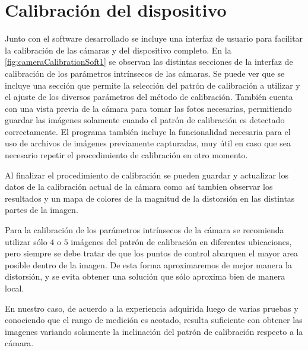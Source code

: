 \section{Calibración del dispositivo}
Junto con el software desarrollado se incluye una interfaz de usuario para facilitar la calibración de las cámaras y del dispositivo completo. En la \autoref{fig:cameraCalibrationSoft1} se observan las distintas secciones de la interfaz de calibración de los parámetros intrínsecos de las cámaras. 
Se puede ver que se incluye una sección que permite la selección del patrón de calibración a utilizar y el ajuste de los diversos parámetros del método de calibración. También cuenta con una vista previa de la cámara para tomar las fotos necesarias, permitiendo guardar las imágenes solamente cuando el patrón de calibración es detectado correctamente. El programa también incluye la funcionalidad necesaria para el uso de archivos de imágenes previamente capturadas, muy útil en caso que sea necesario repetir el procedimiento de calibración en otro momento.

Al finalizar el procedimiento de calibración se pueden guardar y actualizar los datos de la calibración actual de la cámara como así tambien observar los resultados y un mapa de colores de la magnitud de la distorsión en las distintas partes de la imagen.

Para la calibración de los parámetros intrínsecos de la cámara se recomienda utilizar sólo $4$ o $5$ imágenes del patrón de calibración en diferentes ubicaciones, pero siempre se debe tratar de que los puntos de control abarquen el mayor area posible dentro de la imagen. De esta forma aproximaremos de mejor manera la distorsión, y se evita obtener una solución que sólo aproxima bien de manera local. 

En nuestro caso, de acuerdo a la experiencia adquirida luego de varias pruebas y conociendo que el rango de medición es acotado, resulta suficiente con obtener las imagenes variando solamente la inclinación del patrón de calibración respecto a la cámara.

